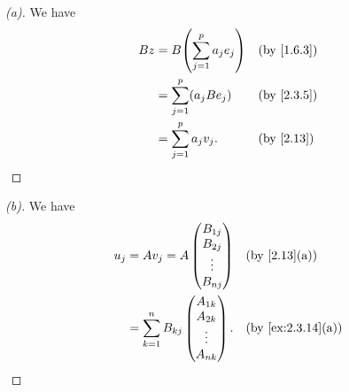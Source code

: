\begin{proof}[(a)]
	We have
	\begin{align*}
		Bz & = B \pa{\sum_{j = 1}^p a_j e_j} &  & \by{1.6.3} \\
		   & = \sum_{j = 1}^p (a_j B e_j)    &  & \by{2.3.5} \\
		   & = \sum_{j = 1}^p a_j v_j.       &  & \by{2.13}
	\end{align*}
\end{proof}

\begin{proof}[(b)]
	We have
	\begin{align*}
		u_j & = A v_j = A \begin{pmatrix}
			                  B_{1 j} \\
			                  B_{2 j} \\
			                  \vdots  \\
			                  B_{n j}
		                  \end{pmatrix}              &  & \by{2.13}[a]       \\
		    & = \sum_{k = 1}^n B_{k j} \begin{pmatrix}
			                               A_{1 k} \\
			                               A_{2 k} \\
			                               \vdots  \\
			                               A_{n k}
		                               \end{pmatrix}. &  & \by{ex:2.3.14}[a]
	\end{align*}
\end{proof}

